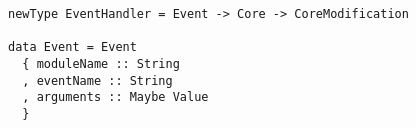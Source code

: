 \begin{verbatim}
newType EventHandler = Event -> Core -> CoreModification

data Event = Event
  { moduleName :: String
  , eventName :: String
  , arguments :: Maybe Value
  }

\end{verbatim}
